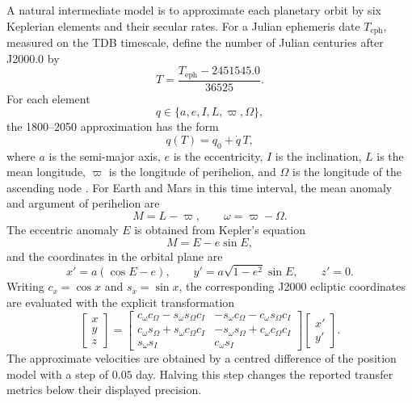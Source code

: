 \documentclass[11pt,a4paper]{article}
\begin{document}
A natural intermediate model is to approximate each planetary orbit by six
Keplerian elements and their secular rates. For a Julian ephemeris date
$T_{\mathrm{eph}}$, measured on the TDB timescale, define the number of Julian
centuries after J2000.0 by
\begin{equation}
  T=\frac{T_{\mathrm{eph}}-2451545.0}{36525}.
\end{equation}
For each element
\begin{equation}
  q\in\{a,e,I,L,\varpi,\Omega\},
\end{equation}
the 1800--2050 approximation has the form
\begin{equation}
  q(T)=q_0+\dot q\,T,
  \label{eq:standish-elements}
\end{equation}
where $a$ is the semi-major axis, $e$ is the eccentricity, $I$ is the
inclination, $L$ is the mean longitude, $\varpi$ is the longitude of
perihelion, and $\Omega$ is the longitude of the ascending node
\cite{standish1992,jplapprox}. For Earth and Mars in this time interval, the
mean anomaly and argument of perihelion are
\begin{equation}
  M=L-\varpi,
  \qquad
  \omega=\varpi-\Omega.
\end{equation}
The eccentric anomaly $E$ is obtained from Kepler's equation
\begin{equation}
  M=E-e\sin E,
  \label{eq:standish-kepler}
\end{equation}
and the coordinates in the orbital plane are
\begin{equation}
  x'=a(\cos E-e),
  \qquad
  y'=a\sqrt{1-e^2}\sin E,
  \qquad
  z'=0.
\end{equation}
Writing $c_x=\cos x$ and $s_x=\sin x$, the corresponding J2000 ecliptic
coordinates are evaluated with the explicit transformation
\begin{equation}
\begin{bmatrix}
 x\\y\\z
\end{bmatrix}
=
\begin{bmatrix}
 c_\omega c_\Omega-s_\omega s_\Omega c_I &
 -s_\omega c_\Omega-c_\omega s_\Omega c_I\\
 c_\omega s_\Omega+s_\omega c_\Omega c_I &
 -s_\omega s_\Omega+c_\omega c_\Omega c_I\\
 s_\omega s_I & c_\omega s_I
\end{bmatrix}
\begin{bmatrix}
 x'\\y'
\end{bmatrix}.
\label{eq:standish-rotation}
\end{equation}
The approximate velocities are obtained by a centred difference of the
position model with a step of $0.05$ day. Halving this step changes the
reported transfer metrics below their displayed precision.
\end{document}
